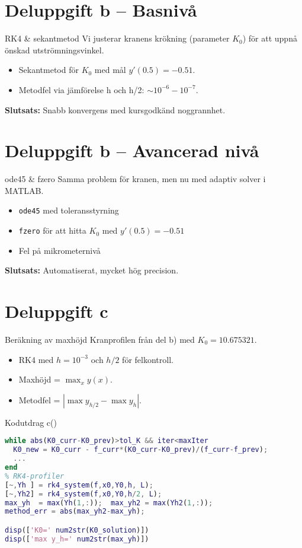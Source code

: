 \documentclass{beamer}
\begin{document}
\section{Deluppgift b – Basnivå}
\begin{frame}{RK4 & sekantmetod}
  \small Vi justerar kranens krökning (parameter $K_0$) för att uppnå önskad utströmningsvinkel.\
  \begin{itemize}
    \item Sekantmetod för $K_0$ med mål $y'(0.5)=-0.51$.
    \item Metodfel via jämförelse h och h/2: $\sim10^{-6}-10^{-7}$.
  \end{itemize}
  \textbf{Slutsats:} Snabb konvergens med kursgodkänd noggrannhet.
\end{frame}

\section{Deluppgift b – Avancerad nivå}
\begin{frame}{ode45 & fzero}
  \small Samma problem för kranen, men nu med adaptiv solver i MATLAB.\
  \begin{itemize}
    \item \texttt{ode45} med toleransstyrning
    \item \texttt{fzero} för att hitta $K_0$ med $y'(0.5)=-0.51$
    \item Fel på mikrometernivå
  \end{itemize}
  \textbf{Slutsats:} Automatiserat, mycket hög precision.
\end{frame}

\section{Deluppgift c}
\begin{frame}{Beräkning av maxhöjd}
  \small Kranprofilen från del b) med $K_0=10.675321$.\
  \begin{itemize}
    \item RK4 med $h=10^{-3}$ och $h/2$ för felkontroll.
    \item Maxhöjd = $\max_x y(x)$.
    \item Metodfel = $|\max y_{h/2}-\max y_h|$.
  \end{itemize}
\end{frame}

\begin{frame}[fragile]{Kodutdrag c()}
\small
\begin{lstlisting}[language=Matlab]
% Sekantmetod för K0
while abs(K0_curr-K0_prev)>tol_K && iter<maxIter
  K0_new = K0_curr - f_curr*(K0_curr-K0_prev)/(f_curr-f_prev);
  ...
end
% RK4-profiler
[~,Yh ] = rk4_system(f,x0,Y0,h, L);
[~,Yh2] = rk4_system(f,x0,Y0,h/2, L);
max_yh  = max(Yh(1,:));  max_yh2 = max(Yh2(1,:));
method_err = abs(max_yh2-max_yh);

disp(['K0=' num2str(K0_solution)])
disp(['max y_h=' num2str(max_yh)])
\end{lstlisting}
\end{frame}
\end{document}
